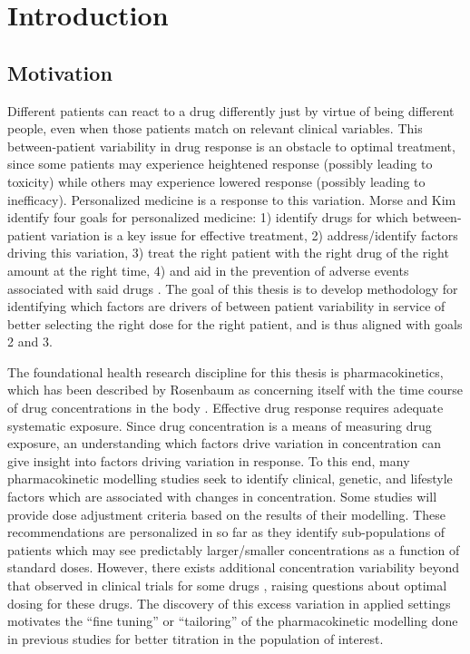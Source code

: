 \chapter{Introduction}

\section{Motivation}

Different patients can react to a drug differently just by virtue of being different people, even when those patients match on relevant clinical variables.  This between-patient variability in drug response is an obstacle to optimal treatment, since some patients may experience heightened response (possibly leading to toxicity) while others may experience lowered response (possibly leading to inefficacy).  Personalized medicine is a response to this variation.  Morse and Kim identify four goals for personalized medicine: 1) identify drugs for which between-patient variation is a key issue for effective treatment,  2) address/identify factors driving this variation, 3) treat the right patient with the right drug  of the right amount at the right time, 4) and aid in the prevention of adverse events associated with said drugs \cite{morse2015personalized}.  The goal of this thesis is to develop methodology for identifying which factors are drivers of between patient variability in service of better selecting the right dose for the right patient, and is thus aligned with goals 2 and 3.

The foundational health research discipline for this thesis is pharmacokinetics, which has been described by Rosenbaum as concerning itself with the time course of drug concentrations in the body \cite{ rosenbaum2016basic}.
Effective drug response requires adequate systematic exposure.  Since drug concentration is a means of measuring drug exposure,  an understanding which factors drive variation in concentration can give insight into factors driving variation in response.  To this end, many pharmacokinetic modelling studies seek to identify clinical, genetic, and lifestyle factors which are associated with changes in concentration. Some studies will provide dose adjustment criteria based on the results of their modelling. These recommendations are personalized in so far as they identify sub-populations of patients which may see predictably larger/smaller concentrations as a function of standard doses. However, there exists additional concentration variability beyond that observed in clinical trials for some drugs \cite{sukumar2019apixaban}, raising questions about optimal dosing for these drugs.  The discovery of this excess variation in applied settings motivates the ``fine tuning'' or ``tailoring'' of the pharmacokinetic modelling done in previous studies for better titration in the population of interest.

